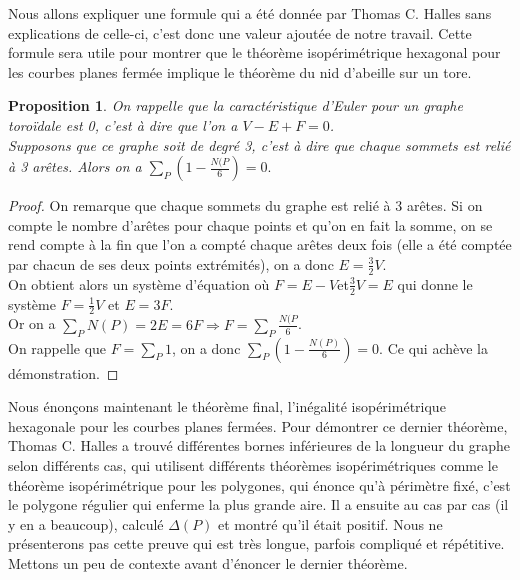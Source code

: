 \documentclass{book}
\newtheorem{proposition}{Proposition}
\newtheorem{proof}{Preuve}
\begin{document}
{\noindent Nous allons expliquer une formule qui a été donnée par Thomas C. Halles sans explications de celle-ci, c'est donc une valeur ajoutée de notre travail. Cette formule sera utile pour montrer que le théorème isopérimétrique hexagonal pour les courbes planes fermée implique le théorème du nid d'abeille sur un tore.}

\begin{tcolorbox}[colback=red!6]
\begin{proposition}
On rappelle que la caractéristique d'Euler pour un graphe toroïdale est 0, c'est à dire que l'on a $V-E+F = 0$.\\
Supposons que ce graphe soit de degré 3, c'est à dire que chaque sommets est relié à 3 arêtes.
Alors on a $\underset{P}{\sum}(1-\frac{N(P}{6}) = 0.$
\end{proposition}
\end{tcolorbox}

\begin{proof}
On remarque que chaque sommets du graphe est relié à 3 arêtes. Si on compte le nombre d'arêtes pour chaque points et qu'on en fait la somme, on se rend compte à la fin que l'on a compté chaque arêtes deux fois (elle a été comptée par chacun de ses deux points extrémités), on a donc $E = \frac{3}{2} V$.\\
On obtient alors un système d'équation où $F = E - V$et$ \frac{3}{2}V = E$ qui donne le système $F = \frac{1}{2} V$ et $E = 3F$.\\
Or on a $\underset{P}{\sum}N(P) = 2E = 6F \Rightarrow F = \underset{P}{\sum} \frac{N(P}{6}$.\\
On rappelle que $F = \underset{P}{\sum}1$, on a donc $\underset{P}{\sum}(1-\frac{N(P)}{6})=0$. Ce qui achève la démonstration.
\end{proof}

{\noindent Nous énonçons maintenant le théorème final, l'inégalité isopérimétrique hexagonale pour les courbes planes fermées. }Pour démontrer ce dernier théorème, Thomas C. Halles a trouvé différentes bornes inférieures de la longueur du graphe selon différents cas, qui utilisent différents théorèmes isopérimétriques comme le théorème isopérimétrique pour les polygones, qui énonce qu'à périmètre fixé, c'est le polygone régulier qui enferme la plus grande aire. Il a ensuite au cas par cas (il y en a beaucoup), calculé $\Delta (P)$ et montré qu'il était positif. Nous ne présenterons pas cette preuve qui est très longue, parfois compliqué et répétitive.\\
Mettons un peu de contexte avant d'énoncer le dernier théorème.\\
\end{document}
